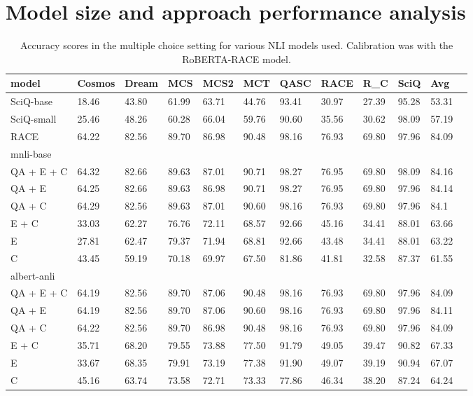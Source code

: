 \documentclass[11pt]{article}
\begin{document}
\section{Model size and approach performance analysis}
\label{sec:appendix}

\begin{table*}[]
\centering
\begin{tabular}{llllllllllll}
\hline
model & Cosmos & Dream & MCS & MCS2 & MCT & QASC & RACE & R_C & SciQ & Avg \\ \hline
SciQ-base & 18.46 & 43.80 & 61.99 & 63.71 & 44.76 & 93.41 & 30.97 & 27.39 & 95.28 & 53.31 \\
SciQ-small &  25.46 & 48.26 & 60.28 & 66.04 & 59.76 & 90.60 & 35.56 & 30.62 & 98.09 & 57.19 \\
RACE & 64.22 & 82.56 & 89.70 & 86.98 & 90.48 & 98.16 & 76.93 & 69.80 & 97.96 & 84.09 \\ \hline
mnli-base \\ 
 QA + E + C & 64.32 & 82.66 & 89.63 & 87.01 & 90.71 & 98.27 & 76.95 & 69.80 & 98.09 & 84.16 \\
  QA + E & 64.25 & 82.66 & 89.63 & 86.98 & 90.71 & 98.27 & 76.95 & 69.80 & 97.96 & 84.14 \\
  QA + C & 64.29 & 82.56 & 89.63 & 87.01 & 90.60 & 98.16 & 76.93 & 69.80 & 97.96 & 84.1 \\
  E + C & 33.03 & 62.27 & 76.76 & 72.11 & 68.57 & 92.66 & 45.16 & 34.41 & 88.01 & 63.66 \\
  E & 27.81 & 62.47 & 79.37 & 71.94 & 68.81 & 92.66 & 43.48 & 34.41 & 88.01 & 63.22 \\
  C & 43.45 & 59.19 & 70.18 & 69.97 & 67.50 & 81.86 & 41.81 & 32.58 & 87.37 & 61.55 \\ \hline
 albert-anli \\ 
QA + E + C & 64.19 & 82.56 & 89.70 & 87.06 & 90.48 & 98.16 & 76.93 & 69.80 & 97.96 & 84.09 \\
  QA + E & 64.19 & 82.56 & 89.70 & 87.06 & 90.60 & 98.16 & 76.93 & 69.80 & 97.96 & 84.11 \\
  QA + C & 64.22 & 82.56 & 89.70 & 86.98 & 90.48 & 98.16 & 76.93 & 69.80 & 97.96 & 84.09 \\
  E + C & 35.71 & 68.20 & 79.55 & 73.88 & 77.50 & 91.79 & 49.05 & 39.47 & 90.82 & 67.33 \\
  E & 33.67 & 68.35 & 79.91 & 73.19 & 77.38 & 91.90 & 49.07 & 39.19 & 90.94 & 67.07 \\
  C & 45.16 & 63.74 & 73.58 & 72.71 & 73.33 & 77.86 & 46.34 & 38.20 & 87.24 & 64.24 \\ \hline
\end{tabular}
\caption{Accuracy scores in the multiple choice setting for various NLI models used. Calibration was with the RoBERTA-RACE model.}
\label{tab:cross_mc_performance}
\end{table*}
\end{document}

